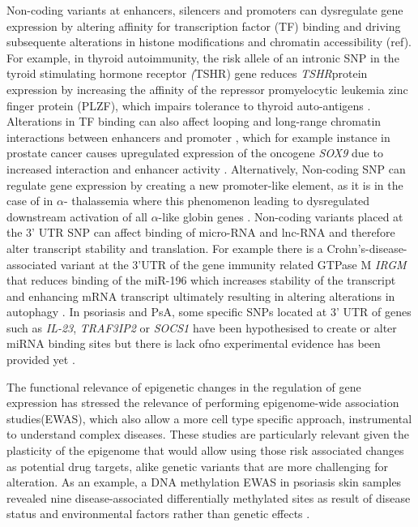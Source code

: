 Non-coding variants at enhancers, silencers and promoters can dysregulate gene expression by altering affinity for transcription factor (TF) binding  and driving subsequente alterations in histone modifications and chromatin accessibility (ref). For example, in thyroid autoimmunity, the risk allele of an intronic SNP in the tyroid stimulating hormone receptor \textit(TSHR) gene reduces \textit{TSHR}protein expression by increasing the affinity of the repressor promyelocytic leukemia zinc finger protein (PLZF), which impairs tolerance to thyroid auto-antigens \parencite{Stefan2014}. Alterations in TF binding can also affect looping and long-range chromatin interactions between enhancers and promoter , which for example instance in prostate cancer causes upregulated expression of the oncogene \textit{SOX9} due to increased interaction and enhancer activity  \parencite{Zhang2012}. Alternatively, Non-coding SNP can regulate gene expression by creating a new promoter-like element, as it is in the case of in $\alpha$- thalassemia where this phenomenon leading to  dysregulated downstream activation of all $\alpha$-like globin genes \parencite{Gobbi2006}.  
Non-coding variants placed at the 3' UTR SNP can affect binding of micro-RNA and lnc-RNA and therefore alter transcript stability and translation. For example  there is a Crohn’s-disease-associated variant at the 3'UTR of the gene immunity related GTPase M \textit{IRGM} that reduces binding of the miR-196 which increases stability of the transcript and enhancing mRNA transcript ultimately resulting in altering alterations in autophagy  \parencite{Brest2011}. 
In psoriasis and PsA, some specific SNPs located at 3' UTR of genes such as \textit{IL-23}, \textit{TRAF3IP2} or \textit{SOCS1} have been hypothesised to create or alter miRNA binding sites but there is lack ofno experimental evidence has been provided yet \parencite{Pivarcsi2014}.

The functional relevance of epigenetic changes in the regulation of gene expression has stressed the relevance of performing epigenome-wide association studies(EWAS), which also allow a more cell type specific approach, instrumental to understand complex diseases. These studies are particularly relevant given the plasticity of the epigenome that would allow using those risk associated changes as potential drug targets, alike genetic variants that are more challenging for alteration. As an example, a DNA methylation EWAS in psoriasis skin samples revealed nine disease-associated differentially methylated sites as result of disease status and environmental factors rather than genetic effects \parencite{Zhou2016}.

